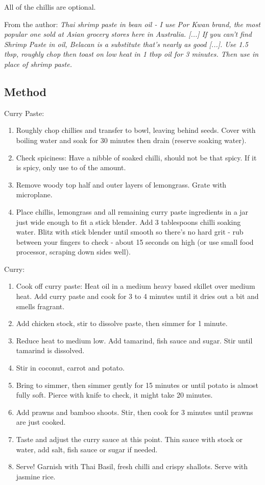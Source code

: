   All of the chillis are optional.

  From the author: \emph{
    Thai shrimp paste in bean oil - I use Por Kwan brand, the most popular one sold at Asian grocery stores here in Australia. [...] If you can't find Shrimp Paste in oil, Belacan is a substitute that's nearly as good [...]. Use 1.5 tbsp, roughly chop then toast on low heat in 1 tbsp oil for 3 minutes. Then use in place of shrimp paste.
  }
  
  \subsection{Method}

  Curry Paste:
  
  \begin{enumerate}
    \item Roughly chop chillies and transfer to bowl, leaving behind seeds. Cover with boiling water and soak for 30 minutes then drain (reserve soaking water).
    \item Check spiciness: Have a nibble of soaked chilli, should not be that spicy. If it is spicy, only use  to  of the amount.
    \item Remove woody top half and outer layers of lemongrass. Grate with microplane.
    \item Place chillis, lemongrass and all remaining curry paste ingredients in a jar just wide enough to fit a stick blender. Add 3 tablespoons chilli soaking water. Blitz with stick blender until smooth so there's no hard grit - rub between your fingers to check - about 15 seconds on high (or use small food processor, scraping down sides well).
  \end{enumerate}

  Curry:

  \begin{enumerate}
    \item Cook off curry paste: Heat oil in a medium heavy based skillet over medium heat. Add curry paste and cook for 3 to 4 minutes until it dries out a bit and smells fragrant.
    \item Add chicken stock, stir to dissolve paste, then simmer for 1 minute.
    \item Reduce heat to medium low. Add tamarind, fish sauce and sugar. Stir until tamarind is dissolved. \item Stir in coconut, carrot and potato.
    \item Bring to simmer, then simmer gently for 15 minutes or until potato is almost fully soft. Pierce with knife to check, it might take 20 minutes.
    \item Add prawns and bamboo shoots. Stir, then cook for 3 minutes until prawns are just cooked.
    \item Taste and adjust the curry sauce at this point. Thin sauce with stock or water, add salt, fish sauce or sugar if needed.
    \item Serve! Garnish with Thai Basil, fresh chilli and crispy shallots. Serve with jasmine rice.
  \end{enumerate}
